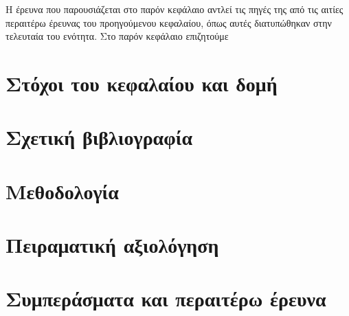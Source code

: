 Η έρευνα που παρουσιάζεται στο παρόν κεφάλαιο αντλεί τις πηγές της από τις
αιτίες περαιτέρω έρευνας του προηγούμενου κεφαλαίου, όπως αυτές διατυπώθηκαν
στην τελευταία του ενότητα. Στο παρόν κεφάλαιο επιζητούμε

\section{Στόχοι του κεφαλαίου και δομή}
  \label{section:02_03_01}
  

\section{Σχετική βιβλιογραφία}
  \label{section:02_03_02}
  

\section{Μεθοδολογία}
  \label{section:02_03_03}
  

\section{Πειραματική αξιολόγηση}
  \label{section:02_03_04}
  

\section{Συμπεράσματα και περαιτέρω έρευνα}
  \label{section:02_03_05}
  
